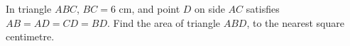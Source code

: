 In triangle $ABC$, $BC=6$ cm, and point $D$ on side $AC$ satisfies $AB=AD=CD=BD$. Find the area of triangle $ABD$, to the nearest square centimetre.

